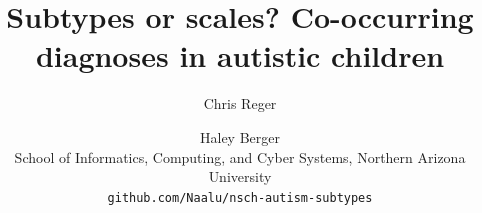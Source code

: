 \documentclass[10pt,twocolumn]{article}
\title{Subtypes or scales? Co-occurring diagnoses in autistic children}
\author{Chris Reger \and Haley Berger\\[2pt]
  \small School of Informatics, Computing, and Cyber Systems, Northern Arizona University\\
  \small \texttt{github.com/Naalu/nsch-autism-subtypes}}
\date{}
\begin{document}
\maketitle










{\small


}
\end{document}

